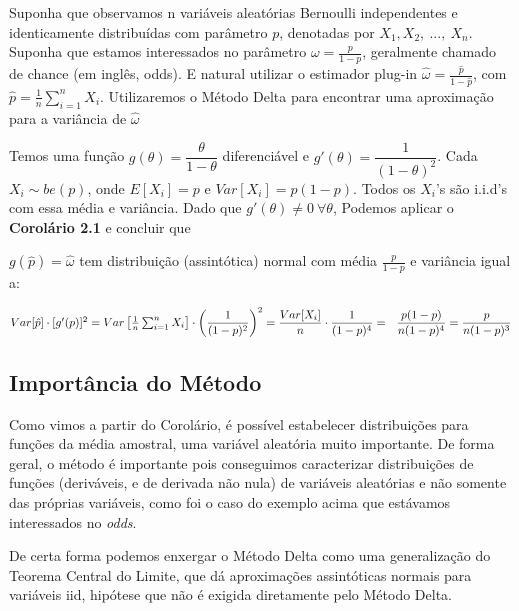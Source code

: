 \documentclass[12pt]{article}
\begin{document}
Suponha que observamos n variáveis aleatórias Bernoulli independentes e identicamente distribuídas com parâmetro $p$, denotadas por $X_1,X_2,~...,~X_n$. Suponha que estamos interessados no parâmetro $\omega=\frac{p}{1-p}$, geralmente chamado de chance (em inglês, odds). E natural utilizar o estimador plug-in
$\hat{\omega}=\frac{\hat{p}}{1-\hat{p}}$, com $\hat{p} = \frac{1}{n}\sum_{i=1}^{n}X_i$. Utilizaremos o Método Delta para encontrar uma aproximação para a variância de $\hat{\omega}$

Temos uma função $g(\theta)=\dfrac{\theta}{1-\theta}$ diferenciável e $g'(\theta)=\dfrac{1}{(1-\theta)^2}$. Cada $X_i\sim be(p)$, onde $E[X_i]=p$ e $Var[X_i]=p(1-p)$. Todos os $X_i$'s são i.i.d's com essa média e variância. Dado que $g'(\theta)\neq 0 ~\forall\theta$, Podemos aplicar o \textbf{Corolário 2.1} e concluir que 

$g(\hat{p})=\hat{\omega}$ tem distribuição (assintótica) normal com média $\frac{p}{1-p}$ e variância igual a:

$Var[\hat{p}]\cdot [g'(p)]^2=\\
Var\left[\frac{1}{n}\sum_{i=1}^{n}X_i\right]\cdot\left(\dfrac{1}{(1-p)^2}\right)^2=\\ \\
\dfrac{Var[X_i]}{n}\cdot\dfrac{1}{(1-p)^4}=~~
\dfrac{p(1-p)}{n(1-p)^4}=\\ \\
\dfrac{p}{n(1-p)^3}$

\subsection{Importância do Método}

Como vimos a partir do Corolário, é possível estabelecer distribuições para funções da média amostral, uma variável aleatória muito importante. De forma geral, o método é importante pois conseguimos caracterizar distribuições de funções (deriváveis, e de derivada não nula) de variáveis aleatórias e não somente das próprias variáveis, como foi o caso do exemplo acima que estávamos interessados no \textit{odds}.

De certa forma podemos enxergar o Método Delta como uma generalização do Teorema Central do Limite, que dá aproximações assintóticas normais para variáveis iid, hipótese que não é exigida diretamente pelo Método Delta.










\newpage



\end{document}
